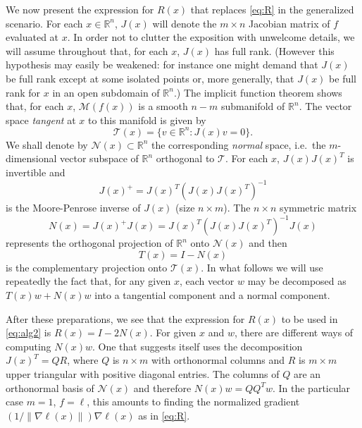 \documentclass[10pt]{article}
\newcommand{\bbR}{\mathbb R}
\begin{document}
We now present the expression for \(R(x)\) that replaces \eqref{eq:R} in the generalized scenario. For each \(x\in\bbR^n\), \(J(x)\) will denote the \(m\times n\) Jacobian matrix of \(f\) evaluated at \(x\). In order not to clutter the exposition with unwelcome details, we will assume throughout that, for each \(x\), \(J(x)\) has full rank. (However this hypothesis may easily be weakened: for instance one might demand that \(J(x)\) be full rank except at some isolated points or, more generally, that \(J(x)\) be full rank for \(x\) in an open subdomain of \(\bbR^n\).) The implicit function theorem shows that, for each \(x\), \({\mathcal M }(f(x))\) is  a smooth \(n-m\) submanifold of \(\bbR^n\). The vector space \emph{tangent} at \(x \) to this manifold  is given by
\begin{equation}\label{eq:orthogonal}
 {\mathcal T}(x) = \{v\in \bbR^n: J(x)v = 0\}.
\end{equation}
We shall denote by \({\mathcal N}(x)\subset \bbR^n\) the corresponding \emph{normal} space, i.e.\ the \(m\)-dimen\-sional vector subspace of \(\bbR^n\)   orthogonal to \({\mathcal T}\).
For each \(x\), \(J(x)J(x)^T\) is invertible and
\begin{equation}\label{eq:J+}
J(x)^+ = J(x)^T(J(x)J(x)^T)^{-1}
\end{equation}
is the  Moore-Penrose inverse of \(J(x)\) (size \(n\times m\)). The \(n\times n\) symmetric matrix
%
\begin{equation}\label{eq:N}
N(x) = J(x)^+J(x) = J(x)^T (J(x)J(x)^T)^{-1}J(x)
\end{equation}
%
represents the orthogonal projection of \(\bbR^n\) onto  \({\mathcal N}(x)\) and then
\begin{equation}\label{eq:T}
T(x)=I-N(x)
\end{equation}
 is the complementary projection onto \({\mathcal T}(x)\). In what follows we will use repeatedly the fact that, for any given \(x\), each vector \(w\) may be decomposed as \(T(x)w+N(x)w\) into a tangential component and a normal component.

 After these preparations, we see that the expression for \(R(x)\) to be used in \eqref{eq:alg2} is \(R(x)=I-2N(x)\).
For given \(x\) and \(w\), there are different ways of computing \(N(x)w\). One that suggests itself uses the decomposition \(J(x)^T=QR\), where \(Q\) is \(n\times m\) with orthonormal columns and \(R\) is \(m\times m\) upper triangular with positive diagonal entries. The columns of \(Q\) are an orthonormal basis of \({\mathcal N}(x)\) and therefore \(N(x)w = QQ^Tw\). In the particular case \(m=1\), \(f=\ell\), this amounts to finding
the normalized gradient \((1/\|\nabla \ell(x)\|)\nabla \ell(x)\) as in \eqref{eq:R}.
\end{document}
